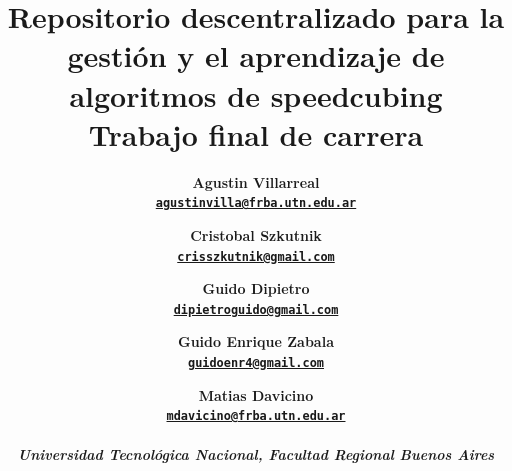 

\graphicspath{ {./img/} }

\author{%
    \bfseries
    Agustin Villarreal \\
    \href{mailto:agustinvilla@frba.utn.edu.ar}{\texttt{\small agustinvilla@frba.utn.edu.ar}} \and
    \bfseries
    Cristobal Szkutnik \\
    \href{mailto:crisszkutnik@gmail.com}{\texttt{\small crisszkutnik@gmail.com}} \and
    \bfseries
    Guido Dipietro \\
    \href{mailto:dipietroguido@gmail.com}{\texttt{\small dipietroguido@gmail.com}} \and
    \bfseries
    Guido Enrique Zabala \\
    \href{mailto:guidoenr4@gmail.com}{\texttt{\small guidoenr4@gmail.com}} \and
    \bfseries
    Matias Davicino \\
    \href{mailto:mdavicino@frba.utn.edu.ar}{\texttt{\small mdavicino@frba.utn.edu.ar}} \\
    \\
    \normalsize\bfseries\itshape
    Universidad Tecnológica Nacional, Facultad Regional Buenos Aires
}
\title{%
    \LARGE\bfseries Repositorio descentralizado para la gestión y el aprendizaje de algoritmos de speedcubing \\
    \Large Trabajo final de carrera
}
\date{}



\maketitle


